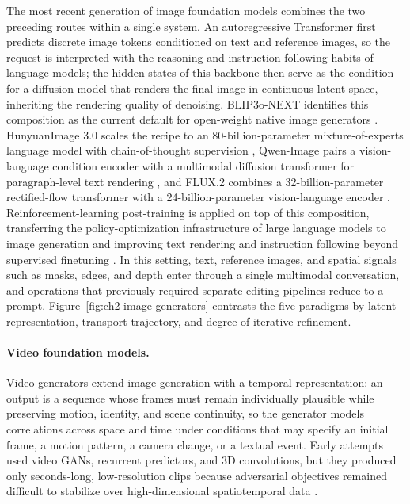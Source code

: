 The most recent generation of image foundation models combines the two preceding routes within a single system. An autoregressive Transformer first predicts discrete image tokens conditioned on text and reference images, so the request is interpreted with the reasoning and instruction-following habits of language models; the hidden states of this backbone then serve as the condition for a diffusion model that renders the final image in continuous latent space, inheriting the rendering quality of denoising. BLIP3o-NEXT identifies this composition as the current default for open-weight native image generators \cite{blip3o2025next}. HunyuanImage 3.0 scales the recipe to an 80-billion-parameter mixture-of-experts language model with chain-of-thought supervision \cite{hunyuanimage3_2025}, Qwen-Image pairs a vision-language condition encoder with a multimodal diffusion transformer for paragraph-level text rendering \cite{qwenimage2025}, and FLUX.2 combines a 32-billion-parameter rectified-flow transformer with a 24-billion-parameter vision-language encoder \cite{flux2_2025}. Reinforcement-learning post-training is applied on top of this composition, transferring the policy-optimization infrastructure of large language models to image generation and improving text rendering and instruction following beyond supervised finetuning \cite{qwenimage2rl_2026}. In this setting, text, reference images, and spatial signals such as masks, edges, and depth enter through a single multimodal conversation, and operations that previously required separate editing pipelines reduce to a prompt. Figure~\ref{fig:ch2-image-generators} contrasts the five paradigms by latent representation, transport trajectory, and degree of iterative refinement.

\paragraph{Video foundation models.}
Video generators extend image generation with a temporal representation: an output is a sequence whose frames must remain individually plausible while preserving motion, identity, and scene continuity, so the generator models correlations across space and time under conditions that may specify an initial frame, a motion pattern, a camera change, or a textual event. Early attempts used video GANs, recurrent predictors, and 3D convolutions, but they produced only seconds-long, low-resolution clips because adversarial objectives remained difficult to stabilize over high-dimensional spatiotemporal data \cite{tulyakov2018mocogan,clark2019dvdgan}.

